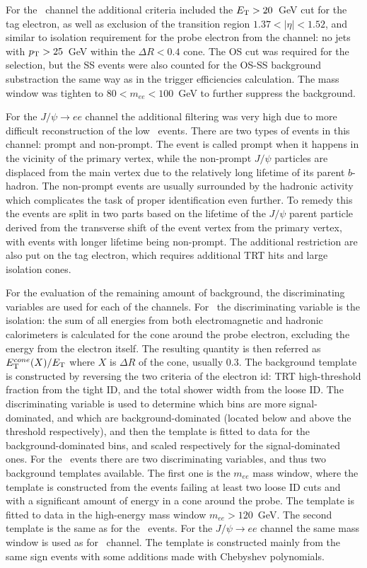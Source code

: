 For the \Zee\ channel the additional criteria included the $E_{\mathrm{T}} > 20$~GeV cut for the tag electron, as well as exclusion of the transition region $1.37 < |\eta| < 1.52$, and similar to isolation requirement for the probe electron from the \Wenu channel: no jets with $p_{\mathrm{T}} > 25$~GeV within the $\Delta R < 0.4$ cone. The OS cut was required for the selection, but the SS events were also counted for the OS-SS background substraction the same way as in the trigger efficiencies calculation. The mass window was tighten to $80 < m_{ee} < 100$~GeV to further suppress the background.

For the $J/\psi \to ee$ channel the additional filtering was very high due to more difficult reconstruction of the low \et\ events. There are two types of events in this channel: prompt and non-prompt. The event is called prompt when it happens in the vicinity of the primary vertex, while the non-prompt $J/\psi$ particles are displaced from the main vertex due to the relatively long lifetime of its parent $b$-hadron. The non-prompt events are usually surrounded by the hadronic activity which complicates the task of proper identification even further. To remedy this the events are split in two parts based on the lifetime of the $J/\psi$ parent particle derived from the transverse shift of the event vertex from the primary vertex, with events with longer lifetime being non-prompt. The additional restriction are also put on the tag electron, which requires additional TRT hits and large isolation cones.

For the evaluation of the remaining amount of background, the discriminating variables are used for each of the channels. For \Wenu\ the discriminating variable is the isolation: the sum of all energies from both electromagnetic and hadronic calorimeters is calculated for the cone around the probe electron, excluding the energy from the electron itself. The resulting quantity is then referred as $E_{\mathrm{T}}^{cone}(X)/E_{\mathrm{T}}$ where $X$ is $\Delta R$ of the cone, usually $0.3$. The background template is constructed by reversing the two criteria of the electron id: TRT high-threshold fraction from the tight ID, and the total shower width from the loose ID. The discriminating variable is used to determine which bins are more signal-dominated, and which are background-dominated (located below and above the threshold respectively), and then the template is fitted to data for the background-dominated bins, and scaled respectively for the signal-dominated ones. For the \Zee\ events there are two discriminating variables, and thus two background templates available. The first one is the $m_{ee}$ mass window, where the template is constructed from the events failing at least two loose ID cuts and with a significant amount of energy in a cone around the probe. The template is fitted to data in the high-energy mass window $m_{ee} > 120$~GeV. The second template is the same as for the \Wenu\ events. For the $J/\psi \to ee$ channel the same mass window is used as for \Zee\ channel. The template is constructed mainly from the same sign events with some additions made with Chebyshev polynomials.

